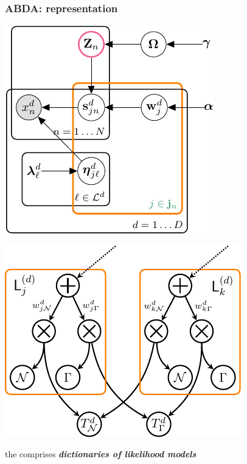\documentclass[xcolor={usenames,dvipsnames,svgnames}, compress, aspectratio=169, 11pt]{beamer}
\begin{document}
\begin{frame}[t, htt=bgrey2]
  \frametitle{ABDA: representation}

  \large
  \begin{minipage}[t]{0.3\linewidth}
    \vspace{15pt}
    \includegraphics[width=.99\linewidth]{figures/joint-param-hspn-crop}
  \end{minipage}\hfill\begin{minipage}[t]{0.3\linewidth}
    \vspace{15pt}
    \includegraphics[width=.99\linewidth]{figures/type-leaf-crop}
  \end{minipage}\hfill\begin{minipage}[t]{0.3\linewidth}
    \vspace{40pt}
    the 
  comprises \textbf{\emph{dictionaries of likelihood models}}
  \end{minipage}  
\end{frame}
\end{document}
